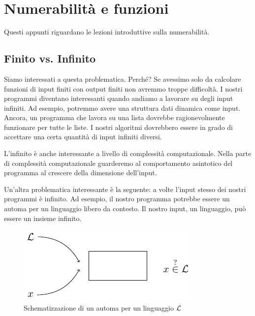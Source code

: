 %
%
%
%
\chapter{Numerabilità e funzioni}

Questi appunti riguardano le lezioni introduttive sulla numerabilità.


\section{Finito vs. Infinito}

Siamo interessati a questa problematica. Perché? Se avessimo solo da calcolare funzioni di input
finiti con output finiti non avremmo troppe difficoltà. I nostri programmi diventano interessanti
quando andiamo a lavorare su degli input infiniti. Ad esempio, potremmo avere una struttura dati
dinamica come input. Ancora, un programma che lavora su una lista dovrebbe ragionevolmente
funzionare per tutte le liste. I nostri algoritmi dovrebbero essere in grado di accettare una
certa quantità di input infiniti diversi.

L'infinito è anche interessante a livello di complessità computazionale. Nella parte di
complessità computazionale guarderemo al comportamento asintotico del programma al crescere della
dimensione dell'input.

Un'altra problematica interessante è la seguente: a volte l'input stesso dei nostri programmi è
infinito.  Ad esempio, il nostro programma potrebbe essere un automa per un linguaggio libero da
contesto. Il nostro input, un linguaggio, può essere un insieme infinito. 

\begin{figure}[h]
    \centering
    \includegraphics{./img/numerability/LanguageExample.pdf}
    \caption{Schematizzazione di un automa per un linguaggio $\mathcal{L}$}
\end{figure}

